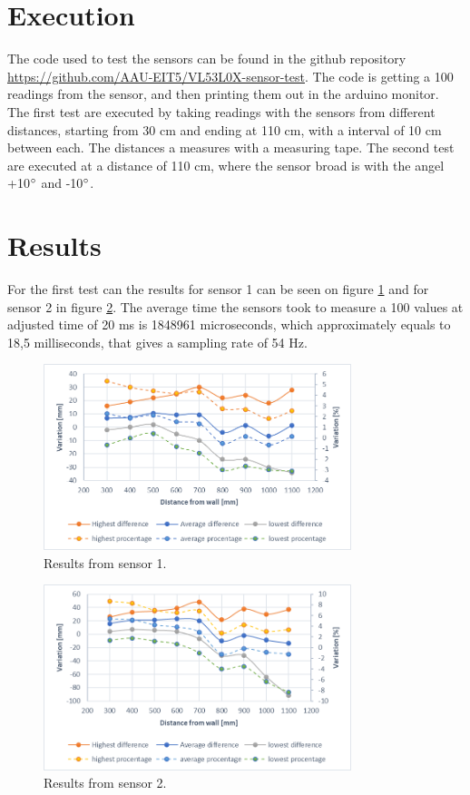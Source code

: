 %
\section*{Execution}
The code used to test the sensors can be found in the github repository \url{https://github.com/AAU-EIT5/VL53L0X-sensor-test}. The code is getting a 100 readings from the sensor, and then printing them out in the arduino monitor.
\newline
The first test are executed by taking readings with the sensors from different distances, starting from 30 cm and ending at 110 cm, with a interval of 10 cm between each. The distances a measures with a measuring tape.
\newline
The second test are executed at a distance of 110 cm, where the sensor broad is with the angel +10$\degree$ and -10$\degree$. 

%
\section*{Results}
For the first test can the results for sensor 1 can be seen on figure \ref{fig:resultatSensor1test} and for sensor 2 in figure \ref{fig:resultatSensor2test}. The average time the sensors took to measure a 100 values at adjusted time of 20 ms is 1848961 microseconds, which approximately equals to 18,5 milliseconds, that gives a sampling rate of 54 Hz. 

\begin{figure}[H]
    \centering
    \includegraphics[width=0.8\textwidth]{figures/Appendix/resultatSensor1Test.png}
    \caption{Results from sensor 1.}
    \label{fig:resultatSensor1test}
\end{figure}
\begin{figure}[H]
    \centering
    \includegraphics[width=0.8\textwidth]{figures/Appendix/resultatSensor2Test.png}
    \caption{Results from sensor 2.}
    \label{fig:resultatSensor2test}
\end{figure}

